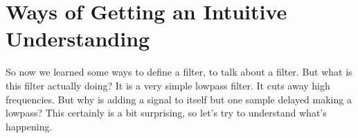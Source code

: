 








    


\section{Ways of Getting an Intuitive Understanding}

So now we learned some ways to define a filter, to talk about a filter. But what is this filter actually doing? It is a very simple lowpass filter. It cuts away high frequencies. But why is adding a signal to itself but one sample delayed making a lowpass? This certainly is a bit surprising, so let's try to understand what's happening.

